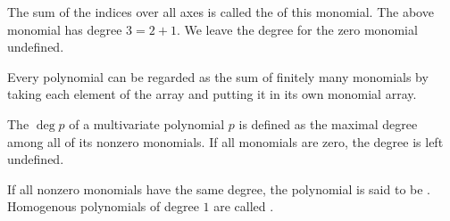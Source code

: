\begin{definition}
  The sum of the indices over all axes is called the  of this monomial. The above monomial has degree \( 3 = 2 + 1 \). We leave the degree for the zero monomial undefined.

  Every polynomial can be regarded as the sum of finitely many monomials by taking each element of the array and putting it in its own monomial array.

  The  \( \deg p \) of a multivariate polynomial \( p \) is defined as the maximal degree among all of its nonzero monomials. If all monomials are zero, the degree is left undefined.

  If all nonzero monomials have the same degree, the polynomial is said to be . Homogenous polynomials of degree \( 1 \) are called .
\end{definition}

